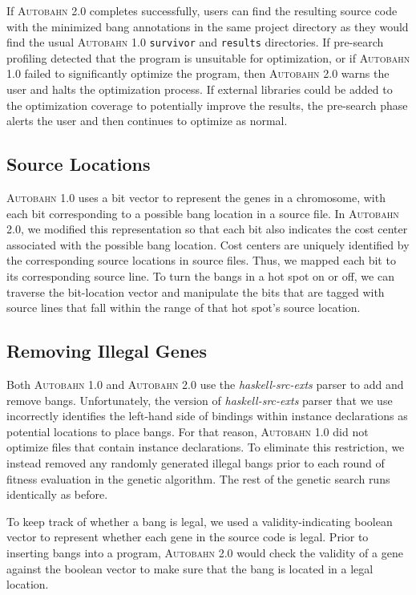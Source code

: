 \documentclass[format=sigplan, review=true, 9pt]{acmart}
\newcommand{\hotspot}[0]{hot spot}
\newcommand{\Ao}[0]{\textsc{Autobahn 1.0}}
\newcommand{\At}[0]{\textsc{Autobahn 2.0}}
\newcommand{\preopt}[0]{pre-search}
\begin{document}
If \At{} completes successfully, users can find the resulting source
code with the minimized bang annotations in the same project
directory as they would find the usual \Ao{} \texttt{survivor}
and \texttt{results} directories. If \preopt{} profiling detected that
the program is unsuitable for optimization, or if \Ao{} failed to
significantly optimize the program, then \At{} warns the user and
halts the optimization process. If external libraries could be added to
the optimization coverage to potentially improve the results,
the \preopt{} phase alerts the user and then continues to optimize as
normal.

\subsection{Source Locations}
\Ao{} uses a bit vector to represent the genes in a
chromosome, with each bit corresponding to a possible bang location in
a source file.  In \At{}, we modified this representation so that each
bit also indicates the cost center associated with the possible bang
location.   Cost centers are uniquely identified by the corresponding source
locations in source files.  Thus, we mapped each bit to its corresponding
source line. To turn the bangs in a \hotspot{} on or off, we can
traverse the bit-location vector and manipulate the bits that are
tagged with source lines that fall within the range of
that \hotspot{}'s source location.

\subsection{Removing Illegal Genes}
Both \Ao{} and \At{} use the \textit{haskell-src-exts} parser to add
and remove bangs.  
Unfortunately, the version of \textit{haskell-src-exts} parser that we use
incorrectly identifies the left-hand side of bindings within instance
declarations as potential locations to place bangs. For that reason,
\Ao{} did not optimize files that contain instance declarations. 
To eliminate this restriction, we instead removed any randomly
generated illegal bangs prior to each round of fitness evaluation in
the genetic algorithm. The rest of the genetic search runs
identically as before.

To keep track of whether a bang is legal, we used a
validity-indicating boolean vector to represent whether each gene in
the source code is legal. Prior to inserting bangs into a
program, \At{} would check the validity of a gene against the boolean
vector to make sure that the bang is located in a legal location.
\end{document}
